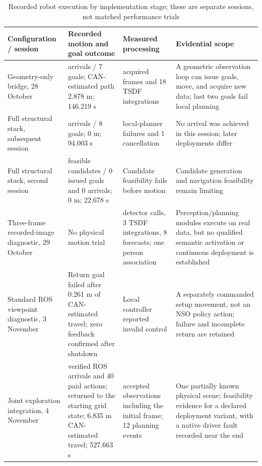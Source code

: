 \begin{table}[!htbp]
\caption{Recorded robot execution by implementation stage; these are separate sessions, not matched performance trials}\label{tab:7}
\small\renewcommand{\arraystretch}{1.12}\setlength{\tabcolsep}{3pt}
\setlength{\JournalTableWidth}{\dimexpr\linewidth-6\tabcolsep\relax}
\begin{tabular}{@{}>{\raggedright\arraybackslash}p{0.22\JournalTableWidth} >{\raggedright\arraybackslash}p{0.24\JournalTableWidth} >{\raggedright\arraybackslash}p{0.24\JournalTableWidth} >{\raggedright\arraybackslash}p{0.3\JournalTableWidth}@{}}
\toprule
Configuration / session & Recorded motion and goal outcome & Measured processing & Evidential scope \\
\midrule
Geometry-only bridge, 28 October & 5 arrivals / 7 goals; CAN-estimated path 2.878 m; 146.219 s & 18 acquired frames and 18 TSDF integrations & A geometric observation loop can issue goals, move, and acquire new data; last two goals fail local planning \\
Full structural stack, subsequent session & 0 arrivals / 8 goals; 0 m; 94.003 s & 7 local-planner failures and 1 cancellation & No arrival was achieved in this session; later deployments differ \\
Full structural stack, second session & 0 feasible candidates / 0 issued goals and 0 arrivals; 0 m; 22.678 s & Candidate feasibility fails before motion & Candidate generation and navigation feasibility remain limiting \\
Three-frame recorded-image diagnostic, 29 October & No physical motion trial & 3 detector calls, 3 TSDF integrations, 8 forecasts; one person association & Perception/planning modules execute on real data, but no qualified semantic activation or continuous deployment is established \\
Standard ROS viewpoint diagnostic, 3 November & Return goal failed after 0.261 m of CAN-estimated travel; zero feedback confirmed after shutdown & Local controller reported invalid control & A separately commanded setup movement, not an NSO policy action; failure and incomplete return are retained \\
Joint exploration integration, 4 November & 40 verified ROS arrivals and 40 paid actions; returned to the starting grid state; 6.835 m CAN-estimated travel; 527.663 s & 41 accepted observations including the initial frame; 12 planning events & One partially known physical scene; feasibility evidence for a declared deployment variant, with a native driver fault recorded near the end \\
\bottomrule
\end{tabular}
\end{table}
